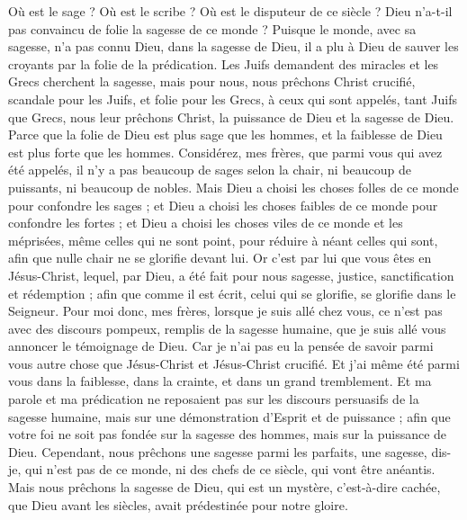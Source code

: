 \begin{multicols}{2}
Où est le sage ? Où est le scribe ? Où est le disputeur de ce siècle ? Dieu n'a-t-il pas convaincu de folie la sagesse de ce monde ?
Puisque le monde, avec sa sagesse, n'a pas connu Dieu, dans la sagesse de Dieu, il a plu à Dieu de sauver les croyants par la folie de la prédication.
Les Juifs demandent des miracles et les Grecs cherchent la sagesse,
mais pour nous, nous prêchons Christ crucifié, scandale pour les Juifs, et folie pour les Grecs,
à ceux qui sont appelés, tant Juifs que Grecs, nous leur prêchons Christ, la puissance de Dieu et la sagesse de Dieu.
Parce que la folie de Dieu est plus sage que les hommes, et la faiblesse de Dieu est plus forte que les hommes.
Considérez, mes frères, que parmi vous qui avez été appelés, il n'y a pas beaucoup de sages selon la chair, ni beaucoup de puissants, ni beaucoup de nobles.
Mais Dieu a choisi les choses folles de ce monde pour confondre les sages ; et Dieu a choisi les choses faibles de ce monde pour confondre les fortes ;
et Dieu a choisi les choses viles de ce monde et les méprisées, même celles qui ne sont point, pour réduire à néant celles qui sont,
afin que nulle chair ne se glorifie devant lui.
Or c'est par lui que vous êtes en Jésus-Christ, lequel, par Dieu, a été fait pour nous sagesse, justice, sanctification et rédemption ;
afin que comme il est écrit, celui qui se glorifie, se glorifie dans le Seigneur.
\VerseOne{}Pour moi donc, mes frères, lorsque je suis allé chez vous, ce n'est pas avec des discours pompeux, remplis de la sagesse humaine, que je suis allé vous annoncer le témoignage de Dieu.
Car je n'ai pas eu la pensée de savoir parmi vous autre chose que Jésus-Christ et Jésus-Christ crucifié.
Et j'ai même été parmi vous dans la faiblesse, dans la crainte, et dans un grand tremblement.
Et ma parole et ma prédication ne reposaient pas sur les discours persuasifs de la sagesse humaine, mais sur une démonstration d'Esprit et de puissance ;
afin que votre foi ne soit pas fondée sur la sagesse des hommes, mais sur la puissance de Dieu.
Cependant, nous prêchons une sagesse parmi les parfaits, une sagesse, dis-je, qui n'est pas de ce monde, ni des chefs de ce siècle, qui vont être anéantis.
Mais nous prêchons la sagesse de Dieu, qui est un mystère, c'est-à-dire cachée, que Dieu avant les siècles, avait prédestinée pour notre gloire.

\end{multicols}
